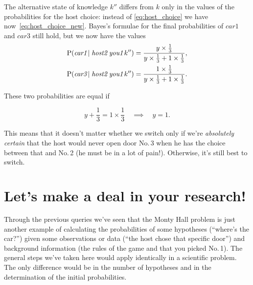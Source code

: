 \documentclass[\ifafour a4paper,12pt,\else a5paper,10pt,\fi%
onecolumn,oneside,article,%
british%
]{memoir}
\theoremstyle{remark}
\theoremstyle{innote}
\newcommand*{\p}{\mathrm{P}}%
\renewcommand*{\|}{\nonscript\,\vert\nonscript\;\mathopen{}}
\newcommand*{\cara}{\textit{car1}}
\newcommand*{\carc}{\textit{car3}}
\newcommand*{\hostb}{\textit{host2}}
\newcommand*{\youa}{\textit{you1}}
\begin{document}
The alternative state of knowledge $k''$ differs from $k$ only in the
values of the probabilities for the host choice: instead of
\eqref{eq:host_choice} we have now~\eqref{eq:host_choice_new}. Bayes's
formulae for the final probabilities of $\cara$ and $\carc$ still hold, but
we now have the values
\begin{align}
  &\p(\cara\|\hostb\;\youa\,k'') =
        \frac{ y \times \frac{1}{3} }{ y \times
          \frac{1}{3} +1 \times \frac{1}{3} },
\\
  &\p(\carc\|\hostb\;\youa\,k'') =
        \frac{ 1 \times \frac{1}{3} }{ y \times
          \frac{1}{3} +1 \times \frac{1}{3} }.
\end{align}

These two probabilities are equal if
\begin{snugshade}
\begin{equation}
  \label{eq:equate_prob2}
  y + \frac{1}{3} =
  1 \times \frac{1}{3}
  \quad\implies\quad
  y=1.
\end{equation}
\end{snugshade}
This means that it doesn't matter whether we switch only if we're
\emph{absolutely certain} that the host would never open door No.\,3 when
he has the choice between that and No.\,2 (he must be in a lot of pain!).
Otherwise, it's still best to switch.


\clearpage

\section{Let's make a deal in your research!}
\label{sec:lab}

Through the previous queries we've seen that the Monty Hall problem is just
another example of calculating the probabilities of some hypotheses
(\enquote{where's the car?}) given some observations or data (\enquote{the
  host chose that specific door}) and background information (the rules of
the game and that you picked No.\,1). The general steps we've taken here
would apply identically in a scientific problem. The only difference would
be in the number of hypotheses and in the determination of the initial
probabilities.
\end{document}
